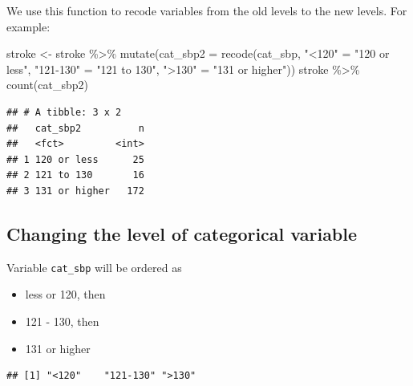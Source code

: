 \documentclass[
  10pt,
]{krantz}
\newenvironment{Shaded}{\begin{snugshade}}{\end{snugshade}}
\newcommand{\AttributeTok}[1]{\textcolor[rgb]{0.77,0.63,0.00}{#1}}
\newcommand{\FunctionTok}[1]{\textcolor[rgb]{0.00,0.00,0.00}{#1}}
\newcommand{\NormalTok}[1]{#1}
\newcommand{\OtherTok}[1]{\textcolor[rgb]{0.56,0.35,0.01}{#1}}
\newcommand{\SpecialCharTok}[1]{\textcolor[rgb]{0.00,0.00,0.00}{#1}}
\newcommand{\StringTok}[1]{\textcolor[rgb]{0.31,0.60,0.02}{#1}}
\providecommand{\tightlist}{%
  \setlength{\itemsep}{0pt}\setlength{\parskip}{0pt}}
\begin{document}
We use this function to recode variables from the old levels to the new levels. For example:

\begin{Shaded}
\begin{Highlighting}[]
\NormalTok{stroke }\OtherTok{\textless{}{-}}\NormalTok{ stroke }\SpecialCharTok{\%\textgreater{}\%}
  \FunctionTok{mutate}\NormalTok{(}\AttributeTok{cat\_sbp2 =} \FunctionTok{recode}\NormalTok{(cat\_sbp, }\StringTok{"\textless{}120"} \OtherTok{=} \StringTok{"120 or less"}\NormalTok{,}
                          \StringTok{"121{-}130"} \OtherTok{=} \StringTok{"121 to 130"}\NormalTok{,}
                          \StringTok{"\textgreater{}130"} \OtherTok{=} \StringTok{"131 or higher"}\NormalTok{))}
\NormalTok{stroke }\SpecialCharTok{\%\textgreater{}\%} \FunctionTok{count}\NormalTok{(cat\_sbp2)}
\end{Highlighting}
\end{Shaded}

\begin{verbatim}
## # A tibble: 3 x 2
##   cat_sbp2          n
##   <fct>         <int>
## 1 120 or less      25
## 2 121 to 130       16
## 3 131 or higher   172
\end{verbatim}

\hypertarget{changing-the-level-of-categorical-variable}{%
\subsection{\texorpdfstring{Changing the level of categorical variable}{Changing the level of categorical variable}}\label{changing-the-level-of-categorical-variable}}

Variable \texttt{cat\_sbp} will be ordered as

\begin{itemize}
\tightlist
\item
  less or 120, then
\item
  121 - 130, then
\item
  131 or higher
\end{itemize}

\begin{Shaded}
\end{Shaded}

\begin{verbatim}
## [1] "<120"    "121-130" ">130"
\end{verbatim}
\end{document}
